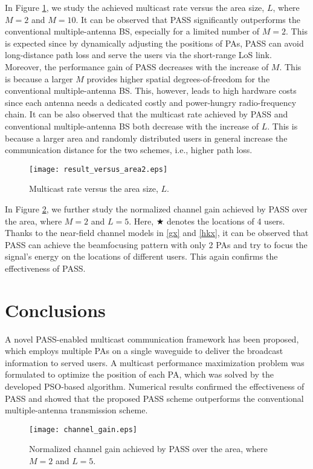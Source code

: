 \documentclass[summary]{ursi}
\begin{document}
In Figure \ref{fig:area}, we study the achieved multicast rate versus the area size, $L$, where $M=2$ and $M=10$. It can be observed that PASS significantly outperforms the conventional multiple-antenna BS, especially for a limited number of $M=2$. This is expected since by dynamically adjusting the positions of PAs, PASS can avoid long-distance path loss and serve the users via the short-range LoS link. Moreover, the performance gain of PASS decreases with the increase of $M$. This is because a larger $M$ provides higher spatial degrees-of-freedom for the conventional multiple-antenna BS. This, however, leads to high hardware costs since each antenna needs a dedicated costly and power-hungry radio-frequency chain. It can be also observed that the multicast rate achieved by PASS and conventional multiple-antenna BS both decrease with the increase of $L$. This is because a larger area and randomly distributed users in general increase the communication distance for the two schemes, i.e., higher path loss.
\begin{figure}[t]
	\centering
	\texttt{[image: result\_versus\_area2.eps]}
	\caption{Multicast rate versus the area size, $L$.}
	\label{fig:area}
\end{figure}

In Figure \ref{fig:channel}, we further study the normalized channel gain achieved by PASS over the area, where $M=2$ and $L=5$. Here, $\bigstar$ denotes the locations of 4 users.  Thanks to the near-field channel models in \eqref{gx} and \eqref{hkx}, it can be observed that PASS can achieve the beamfocusing pattern with only 2 PAs and try to focus the signal's energy on the locations of different users. This again confirms the effectiveness of PASS.

\section{Conclusions}
A novel PASS-enabled multicast communication framework has been proposed, which employs multiple PAs on a single waveguide to deliver the broadcast information to served users. A multicast performance maximization problem was formulated to optimize the position of each PA, which was solved by the developed PSO-based algorithm. Numerical results confirmed the effectiveness of PASS and showed that the proposed PASS scheme outperforms the conventional multiple-antenna transmission scheme.







\begin{figure}[t]
	\centering
	\texttt{[image: channel\_gain.eps]}
	\caption{Normalized channel gain achieved by PASS over the area, where $M=2$ and $L=5$.}
	\label{fig:channel}
\end{figure}
\end{document}
